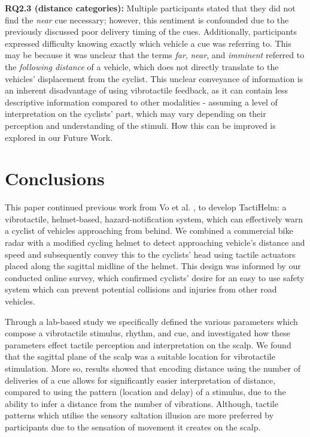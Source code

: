 \documentclass{mpaper}
\begin{document}
\textbf{RQ2.3 (distance categories):} Multiple participants stated that they did not find the \textit{near} cue necessary; however, this sentiment is confounded due to the previously discussed poor delivery timing of the cues. Additionally, participants expressed difficulty knowing exactly which vehicle a cue was referring to. This may be because it was unclear that the terms \textit{far}, \textit{near}, and \textit{imminent} referred to the \textit{following distance} of a vehicle, which does not directly translate to the vehicles' displacement from the cyclist. This unclear conveyance of information is an inherent disadvantage of using vibrotactile feedback, as it can contain less descriptive information compared to other modalities - assuming a level of interpretation on the cyclists' part, which may vary depending on their perception and understanding of the stimuli. How this can be improved is explored in our Future Work.




\section{Conclusions}
This paper continued previous work from Vo et al. \cite{10.1145/3411763.3451580}, to develop TactiHelm: a vibrotactile, helmet-based, hazard-notification system, which can effectively warn a cyclist of vehicles approaching from behind. We combined a commercial bike radar with a modified cycling helmet to detect approaching vehicle's distance and speed and subsequently convey this to the cyclists' head using tactile actuators placed along the sagittal midline of the helmet. This design was informed by our conducted online survey, which confirmed cyclists' desire for an easy to use safety system which can prevent potential collisions and injuries from other road vehicles.

Through a lab-based study we specifically defined the various parameters which compose a vibrotactile stimulus, rhythm, and cue, and investigated how these parameters effect tactile perception and interpretation on the scalp. We found that the sagittal plane of the scalp was a suitable location for vibrotactile stimulation. More so, results showed that encoding distance using the number of deliveries of a cue allows for significantly easier interpretation of distance, compared to using the pattern (location and delay) of a stimulus, due to the ability to infer a distance from the number of vibrations. Although, tactile patterns which utilise the sensory saltation illusion are more preferred by participants due to the sensation of movement it creates on the scalp.
\end{document}

